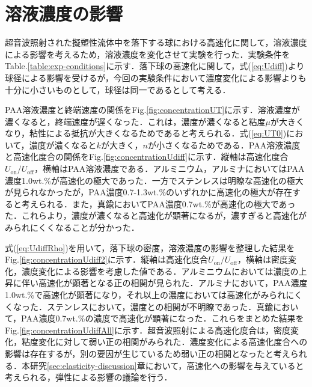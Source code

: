 \section{溶液濃度の影響}
\label{sec:concentration}
超音波照射された擬塑性流体中を落下する球における高速化に関して，溶液濃度による影響を考えるため，溶液濃度を変化させて実験を行った．実験条件をTable.\ref{table:exp-conditions}に示す．落下球の高速化に関して，式(\ref{eq:Udiff})より球径による影響を受けるが，今回の実験条件において濃度変化による影響よりも十分に小さいものとして，球径は同一であるとして考える．

PAA溶液濃度と終端速度の関係をFig.\ref{fig:concentrationUT}に示す．溶液濃度が濃くなると，終端速度が遅くなった．これは，濃度が濃くなると粘度$\mu$が大きくなり，粘性による抵抗が大きくなるためであると考えられる．式(\ref{eq:UT0})において，濃度が濃くなると$k$が大きく，$n$が小さくなるためである．PAA溶液濃度と高速化度合の関係をFig.\ref{fig:concentrationUdiff}に示す．縦軸は高速化度合$U_\text{on}/U_\text{off}$，横軸はPAA溶液濃度である．アルミニウム，アルミナにおいてはPAA濃度1.0wt.\%が高速化の極大であった．一方でステンレスは明瞭な高速化の極大が見られなかったが，PAA濃度0.7-1.3wt.\%のいずれかに高速化の極大が存在すると考えられる．また，真鍮においてPAA濃度0.7wt.\%が高速化の極大であった．これらより，濃度が濃くなると高速化が顕著になるが，濃すぎると高速化がみられにくくなることが分かった．

式(\ref{eq:UdiffRho})を用いて，落下球の密度，溶液濃度の影響を整理した結果をFig.\ref{fig:concentrationUdiff2}に示す．縦軸は高速化度合$U_\text{on}/U_\text{off}$，横軸は密度変化，濃度変化による影響を考慮した値である．アルミニウムにおいては濃度の上昇に伴い高速化が顕著となる正の相関が見られた．アルミナにおいて，PAA濃度1.0wt.\%で高速化が顕著になり，それ以上の濃度においては高速化がみられにくくなった．ステンレスにおいて，濃度との相関が不明瞭であった．真鍮において，PAA濃度0.7wt.\%の濃度で高速化が顕著になった．これらをまとめた結果をFig.\ref{fig:concentrationUdiffAll}に示す．超音波照射による高速化度合は，密度変化，粘度変化に対して弱い正の相関がみられた．濃度変化による高速化度合への影響は存在するが，別の要因が生じているため弱い正の相関となったと考えられる．本研究\ref{sec:elasticity-discussion}章において，高速化への影響を与えていると考えられる，弾性による影響の議論を行う．

